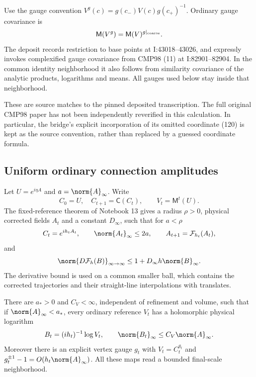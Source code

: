 Use the gauge convention
$V^g(c)=g(c_-)V(c)g(c_+)^{-1}$. Ordinary gauge covariance is
\begin{equation}\label{nb-gauge-covariance}
 \mathsf M(V^g)=\mathsf M(V)^{g|_{\rm coarse}}.
\end{equation}
The deposit records restriction to base points at
I:43018--43026, and expressly invokes complexified gauge
covariance from CMP98 (11) at I:82901--82904. In the common
identity neighborhood it also follows from similarity covariance
of the analytic products, logarithms and means. All gauges used
below stay inside that neighborhood.

These are source matches to the pinned deposited transcription.
The full original CMP98 paper has not been independently
reverified in this calculation. In particular, the bridge's
explicit incorporation of its omitted coordinate (120) is kept
as the source convention, rather than replaced by a guessed
coordinate formula.

\subsection{Uniform ordinary connection amplitudes}

Let $U=e^{i\eta A}$ and $a=\norm{A}_\infty$. Write
\begin{equation}\label{nb-two-trajectories}
 C_0=U,\quad C_{t+1}=\mathsf C(C_t),\qquad
 V_t=\mathsf M^t(U).
\end{equation}
The fixed-reference theorem of Notebook 13 gives a radius
$\rho>0$, physical corrected fields $A_t$ and a constant
$D_\infty$, such that for $a<\rho$
\begin{equation}\label{nb-corrected-input}
 C_t=e^{ih_tA_t},\qquad \norm{A_t}_\infty\le2a,
 \qquad A_{t+1}=\mathcal F_{h_t}(A_t),
\end{equation}
and
\begin{equation}\label{nb-one-step-derivative}
 \norm{D\mathcal F_h(B)}_{\infty\to\infty}
             \le1+D_\infty h\norm{B}_\infty.
\end{equation}
The derivative bound is used on a common smaller ball, which
contains the corrected trajectories and their straight-line
interpolations with translates.

\begin{theorem}\label{nb-trajectory-theorem}
There are $a_*>0$ and $C_V<\infty$, independent of refinement
and volume, such that if $\norm{A}_\infty<a_*$, every ordinary
reference $V_t$ has a holomorphic physical logarithm
\begin{equation}\label{nb-ordinary-amplitude}
 B_t=(ih_t)^{-1}\log V_t,\qquad
             \norm{B_t}_\infty\le C_V\norm{A}_\infty.
\end{equation}
Moreover there is an explicit vertex gauge $g_t$ with
$V_t=C_t^{g_t}$ and $g_t^{\pm1}-1=O(h_t\norm{A}_\infty)$.
All these maps read a bounded final-scale neighborhood.
\end{theorem}

